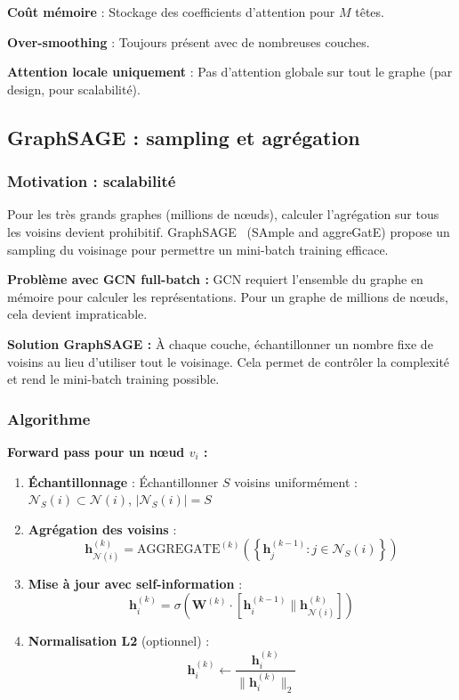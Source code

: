 \textbf{Coût mémoire} : Stockage des coefficients d'attention pour $M$ têtes.

\textbf{Over-smoothing} : Toujours présent avec de nombreuses couches.

\textbf{Attention locale uniquement} : Pas d'attention globale sur tout le graphe (par design, pour scalabilité).

\subsection{GraphSAGE : sampling et agrégation}

\subsubsection{Motivation : scalabilité}

Pour les très grands graphes (millions de nœuds), calculer l'agrégation sur tous les voisins devient prohibitif. GraphSAGE~\cite{Hamilton2017} (SAmple and aggreGatE) propose un sampling du voisinage pour permettre un mini-batch training efficace.

\textbf{Problème avec GCN full-batch :}
GCN requiert l'ensemble du graphe en mémoire pour calculer les représentations. Pour un graphe de millions de nœuds, cela devient impraticable.

\textbf{Solution GraphSAGE :}
À chaque couche, échantillonner un nombre fixe de voisins au lieu d'utiliser tout le voisinage. Cela permet de contrôler la complexité et rend le mini-batch training possible.

\subsubsection{Algorithme}

\textbf{Forward pass pour un nœud $v_i$ :}

\begin{enumerate}
    \item \textbf{Échantillonnage} : Échantillonner $S$ voisins uniformément : $\mathcal{N}_S(i) \subset \mathcal{N}(i)$, $|\mathcal{N}_S(i)| = S$
    
    \item \textbf{Agrégation des voisins} :
    \[
    \mathbf{h}_{\mathcal{N}(i)}^{(k)} = \text{AGGREGATE}^{(k)}\left(\left\{\mathbf{h}_j^{(k-1)} : j \in \mathcal{N}_S(i)\right\}\right)
    \]
    
    \item \textbf{Mise à jour avec self-information} :
    \[
    \mathbf{h}_i^{(k)} = \sigma\left(\mathbf{W}^{(k)} \cdot [\mathbf{h}_i^{(k-1)} \| \mathbf{h}_{\mathcal{N}(i)}^{(k)}]\right)
    \]
    
    \item \textbf{Normalisation L2} (optionnel) :
    \[
    \mathbf{h}_i^{(k)} \leftarrow \frac{\mathbf{h}_i^{(k)}}{\|\mathbf{h}_i^{(k)}\|_2}
    \]
\end{enumerate}

